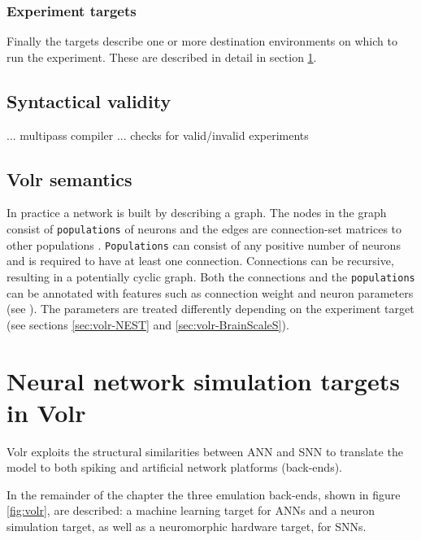 \subsubsection{Experiment targets}
Finally the targets describe one or more destination environments on which
to run the experiment. These are described in detail in section \ref{sec:volr-targets}.

\subsection{Syntactical validity}
... multipass compiler
... checks for valid/invalid experiments

\subsection{Volr semantics}
In practice a network is built by describing a graph.
The nodes in the graph consist of \texttt{populations} of neurons and the edges
are connection-set matrices to other populations \autocite{Djurfeldt2012}.
\texttt{Populations} can consist of any positive number of neurons and is
required to have at least one connection.
Connections can be recursive, resulting in a potentially cyclic graph.
Both the connections and the \texttt{populations} can be annotated with features
such as connection weight and neuron parameters (see ).
The parameters are treated differently depending on the experiment target (see
sections \ref{sec:volr-NEST} and \ref{sec:volr-BrainScaleS}).

\section{Neural network simulation targets in Volr} \label{sec:volr-targets}


Volr exploits the structural similarities between \gls{ANN} and \gls{SNN} to
translate the model to both spiking and artificial network platforms (back-ends).

In the remainder of the chapter the three emulation back-ends, shown in figure
\ref{fig:volr}, are described:
a machine learning target for \gls{ANN}s and a neuron simulation target, as well
as a neuromorphic hardware target, for \gls{SNN}s.

